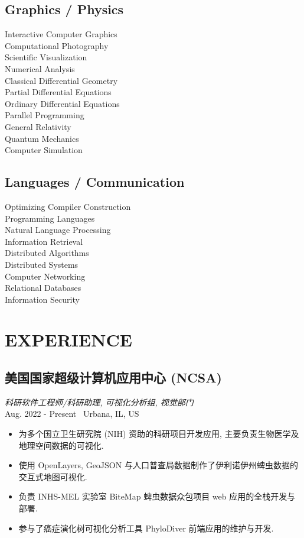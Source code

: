 \documentclass[11pt,twocolumn]{article}
\begin{document}
\subsection*{{Graphics / Physics}}
Interactive Computer Graphics\\
Computational Photography\\
Scientific Visualization\\
Numerical Analysis\\
Classical Differential Geometry\\
Partial Differential Equations\\
Ordinary Differential Equations\\
Parallel Programming\\
General Relativity\\
Quantum Mechanics\\
Computer Simulation

\subsection*{{Languages / Communication}}
Optimizing Compiler Construction\\
Programming Languages\\
Natural Language Processing\\
Information Retrieval\\
Distributed Algorithms\\
Distributed Systems\\
Computer Networking\\
Relational Databases\\
Information Security\\

\newpage

\section*{\textnormal{EXPERIENCE}}

\subsection*{美国国家超级计算机应用中心 (NCSA)}
\textit{科研软件工程师/科研助理, 可视化分析组, 视觉部门}\\
Aug. 2022 - Present \textbullet\ Urbana, IL, US
\begin{itemize}
\item 为多个国立卫生研究院 (NIH) 资助的科研项目开发应用, 主要负责生物医学及地理空间数据的可视化.
\item 使用 OpenLayers, GeoJSON 与人口普查局数据制作了伊利诺伊州蜱虫数据的交互式地图可视化.
\item 负责 INHS-MEL 实验室 BiteMap 蜱虫数据众包项目 web 应用的全栈开发与部署.
\item 参与了癌症演化树可视化分析工具 PhyloDiver 前端应用的维护与开发.
\end{itemize}
\end{document}
